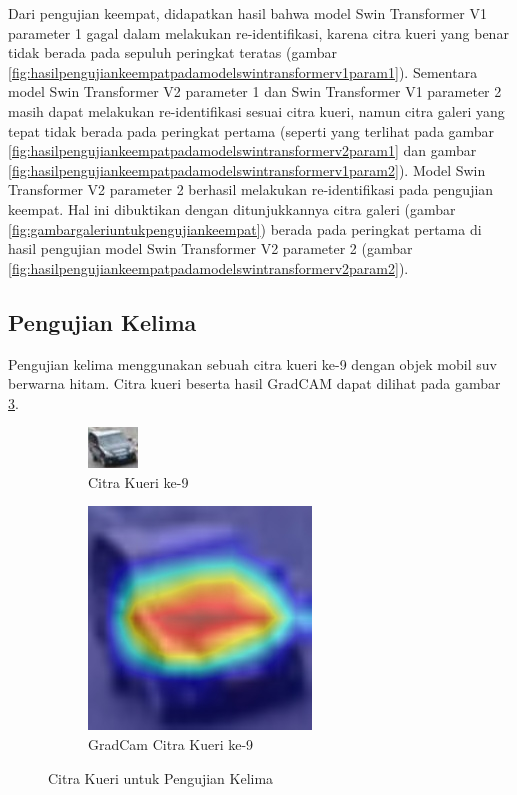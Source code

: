 Dari pengujian keempat, didapatkan hasil bahwa model Swin Transformer V1 parameter 1 gagal dalam melakukan re-identifikasi, 
karena citra kueri yang benar tidak berada pada sepuluh peringkat teratas (gambar 
\ref{fig:hasilpengujiankeempatpadamodelswintransformerv1param1}). Sementara model Swin Transformer V2 parameter 1 dan 
Swin Transformer V1 parameter 2 masih dapat melakukan re-identifikasi sesuai citra kueri, namun citra galeri yang tepat 
tidak berada pada peringkat pertama (seperti yang terlihat pada gambar \ref{fig:hasilpengujiankeempatpadamodelswintransformerv2param1} 
dan gambar \ref{fig:hasilpengujiankeempatpadamodelswintransformerv1param2}). Model Swin Transformer V2 parameter 2 berhasil 
melakukan re-identifikasi pada pengujian keempat. Hal ini dibuktikan dengan ditunjukkannya citra galeri 
(gambar \ref{fig:gambargaleriuntukpengujiankeempat}) berada pada peringkat pertama di hasil pengujian model Swin Transformer 
V2 parameter 2 (gambar \ref{fig:hasilpengujiankeempatpadamodelswintransformerv2param2}).

\subsection{Pengujian Kelima}

Pengujian kelima menggunakan sebuah citra kueri ke-9 dengan objek mobil suv berwarna hitam. Citra kueri 
beserta hasil GradCAM dapat dilihat pada gambar \ref{fig:gambarkueriuntukpengujiankelima}.

\begin{figure}[h!]
  \centering
  \begin{subfigure}{.5\textwidth}
    \centering
    \includegraphics[width=.4\linewidth]{gambar/Que9_1019.jpg}
    \caption{Citra Kueri ke-9}
    \label{gambarkuerinomorsembilan}
  \end{subfigure}%
  \begin{subfigure}{.5\textwidth}
    \centering
    \includegraphics[width=.4\linewidth]{gambar/GradCamQue9_1019.jpg}
    \caption{GradCam Citra Kueri ke-9}
    \label{gradcamgambarkuerinomorsembilan}
  \end{subfigure}
  \caption{Citra Kueri untuk Pengujian Kelima}
  \label{fig:gambarkueriuntukpengujiankelima}
\end{figure}


